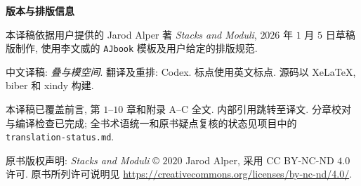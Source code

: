 \vspace*{\fill}
\begingroup
\small
\setlength{\parindent}{0pt}
\setlength{\parskip}{0.8em}
{\large\bfseries\heiti 版本与排版信息}\par
本译稿依据用户提供的 Jarod Alper 著 \textit{Stacks and Moduli}, $2026$ 年 $1$ 月 $5$ 日草稿版制作, 使用李文威的 \texttt{AJbook} 模板及用户给定的排版规范.

中文译稿: \textit{叠与模空间}. 翻译及重排: Codex. 标点使用英文标点. 源码以 XeLaTeX, biber 和 xindy 构建.

本译稿已覆盖前言, 第 $1$--$10$ 章和附录 A--C 全文. 内部引用跳转至译文. 分章校对与编译检查已完成; 全书术语统一和原书疑点复核的状态见项目中的 \texttt{translation-status.md}.

原书版权声明: \textit{Stacks and Moduli} © $2020$ Jarod Alper, 采用 CC BY-NC-ND $4.0$ 许可. 原书所列许可说明见 \url{https://creativecommons.org/licenses/by-nc-nd/4.0/}.
\endgroup
\vspace*{2em}
